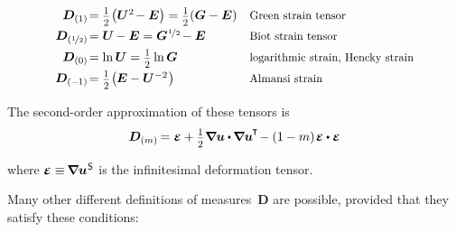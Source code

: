\nopagebreak\begin{equation*}
\begin{array}{r@{\hspace{0.1em}}ll}
\bm{D}_{(1)} & = \smalldisplaystyleonehalf \hspace{-0.25ex} \left( \bm{U}^{2} \hspace{-0.25ex} - \UnitDyad \right) = \smalldisplaystyleonehalf (\bm{G} - \UnitDyad) & \text{\scalebox{0.9}{Green strain tensor}}
\\[.4em]
\bm{D}_{(\nicefrac{1}{2})} & = \bm{U} \hspace{-0.15ex} - \UnitDyad = \bm{G}^{\hspace{.1ex}\nicefrac{1}{2}} \hspace{-0.25ex} - \UnitDyad & \text{\scalebox{0.9}{Biot strain tensor}}
\\[.4em]
\bm{D}_{(0)} & = \ln \bm{U} = \smalldisplaystyleonehalf \ln \bm{G} & \text{\scalebox{0.9}{logarithmic strain, Hencky strain}}
\\[.4em]
\bm{D}_{(-\hspace{-0.1ex}1)} & = \smalldisplaystyleonehalf \hspace{-0.25ex} \left( \hspace{-0.1ex} \UnitDyad - \bm{U}^{-2} \hspace{.1ex} \right) & \text{\scalebox{0.9}{Almansi strain}}
\end{array}
\end{equation*}

The second\hbox{-}order approximation of these tensors is
\[ \bm{D}_{(m)} \hspace{-0.2ex} =
\infinitesimaldeformation
+ \smalldisplaystyleonehalf \hspace{.1ex} \boldnabla\bm{u} \dotp \hspace{-0.1ex} \boldnabla\bm{u}^{\hspace{-0.1ex}\T} \hspace{-0.3ex}
- (1 - m) \hspace{.2ex} \infinitesimaldeformation \dotp \infinitesimaldeformation \]

\vspace{-0.25em}\noindent
where ${\infinitesimaldeformation \equiv \hspace{-0.2ex} \boldnabla {\bm{u}}^{\hspace{.1ex}\mathsf{S}}}$ is the infinitesimal deformation tensor.

Many other different definitions of measures~$\bm{D}$ are possible, provided that they satisfy these conditions:

